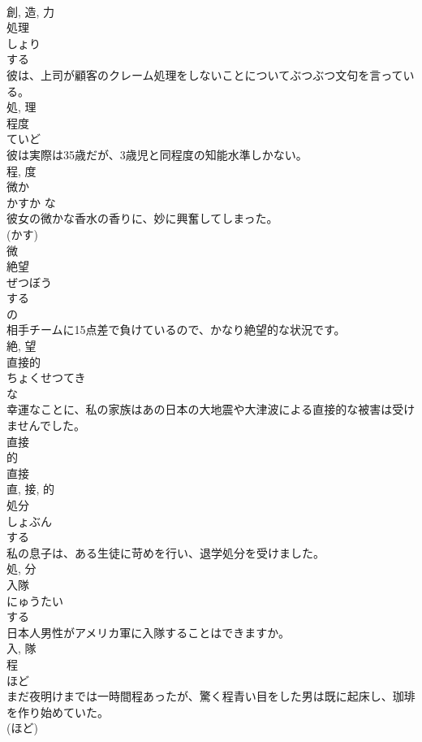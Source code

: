 \documentclass[8pt]{extreport}
\begin{document}
\begin{CJK}{UTF8}{min}
\\	創, 造, 力	
\\	処理	
\\	しょり	
\\	する 
\\	彼は、上司が顧客のクレーム処理をしないことについてぶつぶつ文句を言っている。	
\\	処, 理	
\\	程度	
\\	ていど	
\\	彼は実際は35歳だが、3歳児と同程度の知能水準しかない。	
\\	程, 度	
\\	微か	
\\	かすか	な 
\\	彼女の微かな香水の香りに、妙に興奮してしまった。	
\\	(かす) 
\\	微	
\\	絶望	
\\	ぜつぼう	
\\	する 
\\	の 
\\	相手チームに15点差で負けているので、かなり絶望的な状況です。	
\\	絶, 望	
\\	直接的	
\\	ちょくせつてき	
\\	な 
\\	幸運なことに、私の家族はあの日本の大地震や大津波による直接的な被害は受けませんでした。	
\\	直接 
\\	的 
\\	直接 
\\	直, 接, 的	
\\	処分	
\\	しょぶん	
\\	する 
\\	私の息子は、ある生徒に苛めを行い、退学処分を受けました。	
\\	処, 分	
\\	入隊	
\\	にゅうたい	
\\	する 
\\	日本人男性がアメリカ軍に入隊することはできますか。	
\\	入, 隊	
\\	程	
\\	ほど	
\\	まだ夜明けまでは一時間程あったが、驚く程青い目をした男は既に起床し、珈琲を作り始めていた。	
\\	(ほど) 

\end{CJK}
\end{document}
